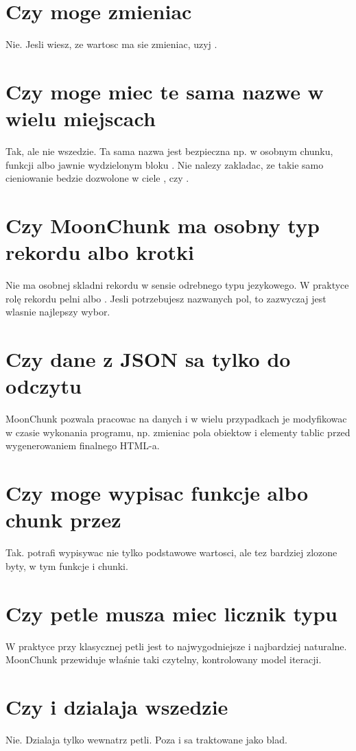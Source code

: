 \section{Czy moge zmieniac }
Nie. Jesli wiesz, ze wartosc ma sie zmieniac, uzyj .

\section{Czy moge miec te sama nazwe w wielu miejscach}
Tak, ale nie wszedzie. Ta sama nazwa jest bezpieczna np. w osobnym chunku, funkcji albo
jawnie wydzielonym bloku . Nie nalezy zakladac, ze takie samo cieniowanie
bedzie dozwolone w ciele ,  czy .

\section{Czy MoonChunk ma osobny typ rekordu albo krotki}
Nie ma osobnej skladni rekordu w sensie odrebnego typu jezykowego. W praktyce rolę
rekordu pelni  albo . Jesli potrzebujesz nazwanych pol, to zazwyczaj
jest wlasnie najlepszy wybor.

\section{Czy dane z JSON sa tylko do odczytu}
MoonChunk pozwala pracowac na danych i w wielu przypadkach je modyfikowac w czasie
wykonania programu, np. zmieniac pola obiektow i elementy tablic przed wygenerowaniem
finalnego HTML-a.

\section{Czy moge wypisac funkcje albo chunk przez }
Tak.  potrafi wypisywac nie tylko podstawowe wartosci, ale tez bardziej
zlozone byty, w tym funkcje i chunki.

\section{Czy petle musza miec licznik typu }
W praktyce przy klasycznej petli  jest to najwygodniejsze i najbardziej naturalne.
MoonChunk przewiduje właśnie taki czytelny, kontrolowany model iteracji.

\section{Czy  i  dzialaja wszedzie}
Nie. Dzialaja tylko wewnatrz petli. Poza  i  sa traktowane jako blad.

